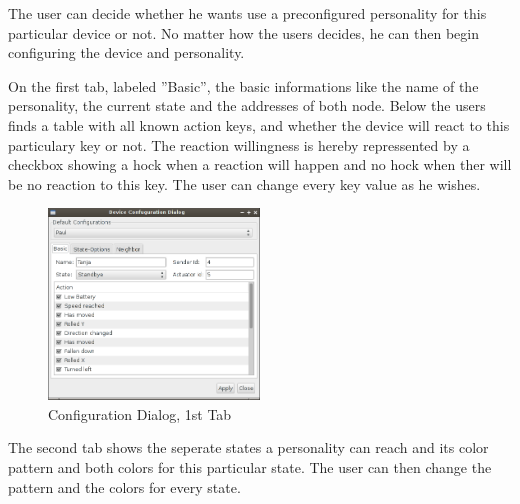 The user can decide whether he wants use a preconfigured personality for this particular device or not. No matter how the users decides, he can then begin configuring the device and personality.

On the first tab, labeled ''Basic'', the basic informations like the name of the personality, the current state and the addresses of both node. Below the users finds a table with all known action keys, and whether the device will react to this particulary key or not. The reaction willingness is hereby repressented by a checkbox showing a hock when a reaction will happen and no hock when ther will be no reaction to this key. The user can change every key value as he wishes.

\begin{figure}[h!]
 \centering
 \includegraphics[width= 0.5\textwidth, clip=true  ,keepaspectratio=true]{./pic/java-server-config01.png}
 \caption{Configuration Dialog, 1st Tab}
 \label{fig:java-server-config01}
\end{figure}

The second tab shows the seperate states a personality can reach and its color pattern and both colors for this particular state. The user can then change the pattern and the colors for every state.





